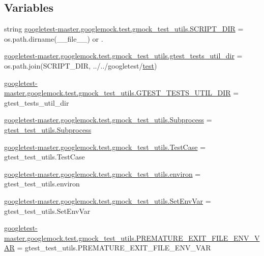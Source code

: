 \subsection*{Variables}
\begin{DoxyCompactItemize}
\item 
string \mbox{\hyperlink{namespacegoogletest-master_1_1googlemock_1_1test_1_1gmock__test__utils_a99d9d8eaf10689f78cd3d580fcf68fc3}{googletest-\/master.\+googlemock.\+test.\+gmock\+\_\+test\+\_\+utils.\+S\+C\+R\+I\+P\+T\+\_\+\+D\+IR}} = os.\+path.\+dirname(\+\_\+\+\_\+file\+\_\+\+\_\+) or \textquotesingle{}.\textquotesingle{}
\item 
\mbox{\hyperlink{namespacegoogletest-master_1_1googlemock_1_1test_1_1gmock__test__utils_ace7bae756171f110e31b17b55eda0b84}{googletest-\/master.\+googlemock.\+test.\+gmock\+\_\+test\+\_\+utils.\+gtest\+\_\+tests\+\_\+util\+\_\+dir}} = os.\+path.\+join(S\+C\+R\+I\+P\+T\+\_\+\+D\+IR, \textquotesingle{}../../googletest/\mbox{\hyperlink{_mutual_8h_a707ee03719e99670bf6cfdfd897b8456}{test}}\textquotesingle{})
\item 
\mbox{\hyperlink{namespacegoogletest-master_1_1googlemock_1_1test_1_1gmock__test__utils_addcc8e7901df8fb490b05ec18577f6a9}{googletest-\/master.\+googlemock.\+test.\+gmock\+\_\+test\+\_\+utils.\+G\+T\+E\+S\+T\+\_\+\+T\+E\+S\+T\+S\+\_\+\+U\+T\+I\+L\+\_\+\+D\+IR}} = gtest\+\_\+tests\+\_\+util\+\_\+dir
\item 
\mbox{\hyperlink{namespacegoogletest-master_1_1googlemock_1_1test_1_1gmock__test__utils_a9b18c328989544633dae206ad3ee4f45}{googletest-\/master.\+googlemock.\+test.\+gmock\+\_\+test\+\_\+utils.\+Subprocess}} = \mbox{\hyperlink{classgtest__test__utils_1_1_subprocess}{gtest\+\_\+test\+\_\+utils.\+Subprocess}}
\item 
\mbox{\hyperlink{namespacegoogletest-master_1_1googlemock_1_1test_1_1gmock__test__utils_af62efb18b8733ce3967c0f25703b95cb}{googletest-\/master.\+googlemock.\+test.\+gmock\+\_\+test\+\_\+utils.\+Test\+Case}} = gtest\+\_\+test\+\_\+utils.\+Test\+Case
\item 
\mbox{\hyperlink{namespacegoogletest-master_1_1googlemock_1_1test_1_1gmock__test__utils_a07a046097af538f36086ff7b4d32d947}{googletest-\/master.\+googlemock.\+test.\+gmock\+\_\+test\+\_\+utils.\+environ}} = gtest\+\_\+test\+\_\+utils.\+environ
\item 
\mbox{\hyperlink{namespacegoogletest-master_1_1googlemock_1_1test_1_1gmock__test__utils_a766f689597f40a03a04a59fd6c44c5e5}{googletest-\/master.\+googlemock.\+test.\+gmock\+\_\+test\+\_\+utils.\+Set\+Env\+Var}} = gtest\+\_\+test\+\_\+utils.\+Set\+Env\+Var
\item 
\mbox{\hyperlink{namespacegoogletest-master_1_1googlemock_1_1test_1_1gmock__test__utils_ab276fcd8122690994599640644132920}{googletest-\/master.\+googlemock.\+test.\+gmock\+\_\+test\+\_\+utils.\+P\+R\+E\+M\+A\+T\+U\+R\+E\+\_\+\+E\+X\+I\+T\+\_\+\+F\+I\+L\+E\+\_\+\+E\+N\+V\+\_\+\+V\+AR}} = gtest\+\_\+test\+\_\+utils.\+P\+R\+E\+M\+A\+T\+U\+R\+E\+\_\+\+E\+X\+I\+T\+\_\+\+F\+I\+L\+E\+\_\+\+E\+N\+V\+\_\+\+V\+AR
\end{DoxyCompactItemize}
